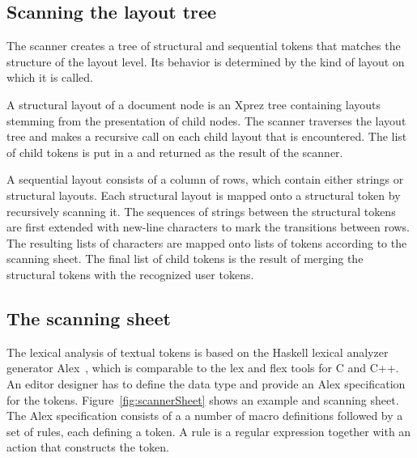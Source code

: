\documentclass{article}[10pt]
\begin{document}
\subsection{Scanning the layout tree}

The scanner creates a tree of structural and sequential tokens that matches the structure of the layout level. Its behavior is determined by the kind of layout on which it is called.


 A structural layout of a document node is an Xprez tree containing layouts stemming from the presentation of child nodes. The scanner traverses the layout tree and makes a recursive call on each child layout that is encountered. The list of child tokens is put in a  and returned as the result of the scanner.

 A sequential layout consists of a column of rows, which contain either strings or structural layouts. Each structural layout is mapped onto a structural token by recursively scanning it. The sequences of strings between the structural tokens are first extended with new-line characters to mark the transitions between rows. The resulting lists of characters are mapped onto lists of  tokens according to the scanning sheet. The final list of child tokens is the result of merging the structural tokens with the recognized user tokens.


\subsection{The scanning sheet}

The lexical analysis of textual tokens is based on the Haskell lexical analyzer generator Alex~\cite{marlow07alex}, which is comparable to the lex and flex tools for C and C++. An editor designer has to define the data type  and provide an Alex specification for the tokens. Figure~\ref{fig:scannerSheet} shows an example  and scanning sheet. The Alex specification consists of a a number of macro definitions followed by a set of rules, each defining a token. A rule is a regular expression together with an action that constructs the token.
\end{document}
